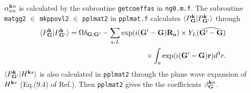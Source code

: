 \documentclass[a4paper,10pt,epsf,fleqn]{article}
\begin{document}
{{{\begin{thebibliography}{00}
\begin{itemize}
\end{itemize}


\noindent [ In {\tt ng0.m.f}, ${\tt QpGcutHakel}$ is assumed as $={\tt 1.5*QpGcut\_psi}$ now.
{\underline But it is not justified enough.}
You will be able to utilize more reasonable ones
which was used in the LDA calculations.]

\noindent $\alpha^{{\bf k} n}_{au}$ is calculated by the subroutine {\tt getcoeffas} in 
{\tt ng0.m.f}.
The subroutine {\tt matgg2} $\in$ {\tt mkppovl2} $\in$ {\tt pplmat2} in {\tt pplmat.f} calculates
$\langle P^{\bf k}_{\bf G}|P^{\bf k}_{{\bf G}'} \rangle$ through
\begin{eqnarray}
\langle P^{\bf k}_{\bf G}|P^{\bf k}_{{\bf G}'} \rangle
= \Omega \delta_{{\bf G},{\bf G}'} -  
\sum_{a,L} \exp( i ({\bf G}'-{\bf G}) {\bf R_a}) 
\times Y_L(\widehat{{\bf G}'-{\bf G}}) \nonumber \\
\times \int_{a} \exp(i({\bf G}'-{\bf G}){\bf r}) d^3r.
\end{eqnarray}
$\langle P^{\bf k}_{{\bf G}'}| H^{{\bf k}s} \rangle$ is also calculated
in {\tt pplmat2} through the plane wave expansion of $H^{{\bf k}s}$
(Eq.(9.4) of Ref.\cite{bott98}). Then {\tt pplmat2} gives the
the coefficients $\beta^{{\bf k}n}_{\bf G}$.


\end{thebibliography}}}}
\end{document}
